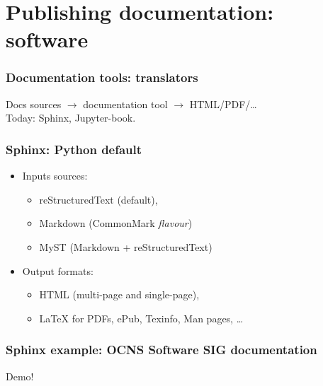 \section{Publishing documentation: software}
\begin{frame}[c]
  \frametitle{Documentation tools: translators}
  Docs sources \(\rightarrow\) documentation tool \(\rightarrow\) HTML/PDF/\ldots{}\\
  Today: \alert{Sphinx}, \alert{Jupyter-book}.
\end{frame}
\begin{frame}[c]
  \frametitle{Sphinx: Python default}
  \begin{itemize}
    \item Inputs sources:
      \begin{itemize}
        \item reStructuredText (default),
        \item Markdown (CommonMark \emph{flavour}\footnotemark[5]{})
        \item MyST (Markdown + reStructuredText)\footnotemark[6]{}
      \end{itemize}
    \item Output formats:
      \begin{itemize}
        \item HTML (multi-page and single-page),
        \item \LaTeX{} for PDFs, ePub, Texinfo, Man pages, \ldots{}
      \end{itemize}
  \end{itemize}
\end{frame}
\begin{frame}[c]
  \frametitle{Sphinx example: OCNS Software SIG documentation}
  Demo!
\end{frame}
